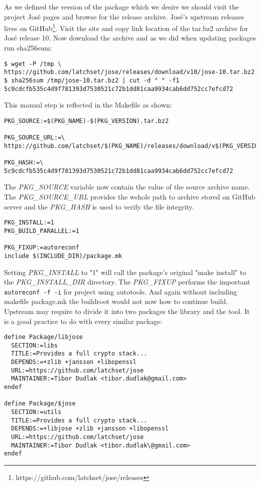 As we defined the version of the package which we desire we should visit the project José pages and browse for the release archive.
José's upstream releases lives on GitHub\footnote{https://github.com/latchset/jose/releases}.
Visit the site and copy link location of the tar.bz2 archive for José release 10.
Now download the archive and as we did when updating packages run sha256sum:
\begin{lstlisting}[columns=fixed,basicstyle=\ttfamily\footnotesize,tabsize=4,backgroundcolor=\color{yellow!10}]
$ wget -P /tmp \
https://github.com/latchset/jose/releases/download/v10/jose-10.tar.bz2
$ sha256sum /tmp/jose-10.tar.bz2 | cut -d " " -f1
5c9cdcfb535c4d9f781393d7530521c72b1dd81caa9934cab6dd752cc7efcd72
\end{lstlisting}
This manual step is reflected in the Makefile as shown:
\begin{lstlisting}[columns=fixed,basicstyle=\ttfamily\footnotesize,tabsize=4,backgroundcolor=\color{yellow!10}]
PKG_SOURCE:=$(PKG_NAME)-$(PKG_VERSION).tar.bz2

PKG_SOURCE_URL:=\
https://github.com/latchset/$(PKG_NAME)/releases/download/v$(PKG_VERSION)/

PKG_HASH:=\
5c9cdcfb535c4d9f781393d7530521c72b1dd81caa9934cab6dd752cc7efcd72
\end{lstlisting}
The {\it PKG\_SOURCE} variable now contain the value of the source archive name.
The {\it PKG\_SOURCE\_URL} provides the wshole path to archive stored on GitHub server and the {\it PKG\_HASH} is used to verify the file integrity.
\begin{lstlisting}[columns=fixed,basicstyle=\ttfamily\footnotesize,tabsize=4,backgroundcolor=\color{yellow!10}]
PKG_INSTALL:=1
PKG_BUILD_PARALLEL:=1

PKG_FIXUP:=autoreconf
include $(INCLUDE_DIR)/package.mk
\end{lstlisting}
Setting {\it PKG\_INSTALL} to "1" will call the package's original "make install" to the {\it PKG\_INSTALL\_DIR} directory.
The {\it PKG\_FIXUP} performs the important {\tt autoreconf -f -i} for project using autotools.
And again without including makefile package.mk the buildroot would not now how to continue build.
Upstream may require to divide it into two packages the library and the tool.
It is a good practice to do with every similar package:
\begin{lstlisting}[columns=fixed,basicstyle=\ttfamily\footnotesize,tabsize=4,backgroundcolor=\color{yellow!10}]
define Package/libjose
  SECTION:=libs
  TITLE:=Provides a full crypto stack...
  DEPENDS:=+zlib +jansson +libopenssl
  URL:=https://github.com/latchset/jose
  MAINTAINER:=Tibor Dudlak <tibor.dudlak@gmail.com>
endef

define Package/$jose
  SECTION:=utils
  TITLE:=Provides a full crypto stack...
  DEPENDS:=+libjose +zlib +jansson +libopenssl
  URL:=https://github.com/latchset/jose
  MAINTAINER:=Tibor Dudlak <tibor.dudlak\@gmail.com>
endef
\end{lstlisting}
